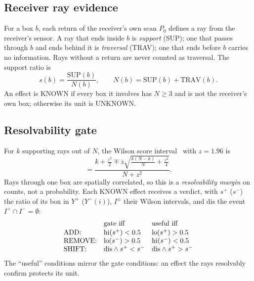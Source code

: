 \documentclass[conference]{IEEEtran}
\begin{document}
\subsection{Receiver ray evidence}
For a box $b$, each return of the receiver's own scan $P_0$ defines a ray from the receiver's sensor. A ray that
ends inside $b$ is \emph{support} (SUP); one that passes through $b$ and ends behind it is \emph{traversal}
(TRAV); one that ends before $b$ carries no information. Rays without a return are never counted as
traversal. The support ratio is
\begin{equation}
s(b)=\frac{\mathrm{SUP}(b)}{N(b)},\qquad N(b)=\mathrm{SUP}(b)+\mathrm{TRAV}(b).
\label{eq:s}
\end{equation}
An effect is KNOWN if every box it involves has $N\ge 3$ and is not the receiver's own box; otherwise its unit
is UNKNOWN.

\subsection{Resolvability gate}
For $k$ supporting rays out of $N$, the Wilson score interval~\cite{wilson1927} with $z=1.96$ is
\begin{equation}
[\mathrm{lo},\mathrm{hi}]=\frac{k+\tfrac{z^2}{2}\mp z\sqrt{\tfrac{k(N-k)}{N}+\tfrac{z^2}{4}}}{N+z^2}.
\label{eq:wilson}
\end{equation}
Rays through one box are spatially correlated, so this is a \emph{resolvability margin} on counts, not a
probability. Each KNOWN effect receives a verdict, with $s^{+}$ ($s^{-}$) the ratio of its box in $Y^{+}$
($Y^{-}(i)$), $I^{\pm}$ their Wilson intervals, and $\mathrm{dis}$ the event $I^{+}\cap I^{-}=\emptyset$:
\begin{equation}
\begin{array}{@{}lll@{}}
 & \text{gate iff} & \text{useful iff}\\[1pt]
\text{ADD:} & \mathrm{hi}(s^{+})<0.5 & \mathrm{lo}(s^{+})>0.5\\
\text{REMOVE:} & \mathrm{lo}(s^{-})>0.5 & \mathrm{hi}(s^{-})<0.5\\
\text{SHIFT:} & \mathrm{dis}\land s^{+}<s^{-} & \mathrm{dis}\land s^{+}>s^{-}
\end{array}
\label{eq:gate}
\end{equation}
The ``useful'' conditions mirror the gate conditions: an effect the rays resolvably confirm protects its unit.
\end{document}
